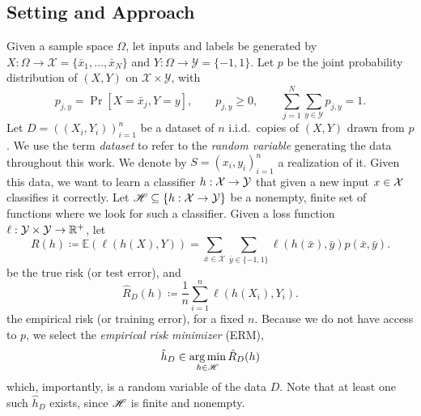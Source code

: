 \documentclass[reqno]{amsart}
\begin{document}
\subsection{Setting and Approach}
Given a sample space $\Omega$, let inputs and labels be generated by $X:\Omega \to \mathcal X = \{\bar x_1,\ldots,\bar x_N\}$ and $Y: \Omega \to \mathcal Y = \{-1, 1\}$. Let $p$ be the joint probability distribution of $(X,Y)$ on $\mathcal X\times\mathcal Y$, with
\[
 p_{j,y}=\Pr[X=\bar x_j,Y=y],\qquad
 p_{j,y}\ge0,\qquad
 \sum_{j=1}^N\sum_{y\in\mathcal Y}p_{j,y}=1.
\]
Let $D = {((X_i, Y_i))}_{i=1}^n$ be a dataset of $n$ i.i.d.\ copies of $(X,Y)$ drawn from $p$. We use the term {\it dataset\/} to refer to the {\it random variable\/} generating the data throughout this work. We denote by $S = {(x_i, y_i)}_{i=1}^n$ a realization of it. Given this data, we want to learn a classifier $h:\mathcal{X}\to\mathcal{Y}$ that given a new input $x\in\mathcal{X}$ classifies it correctly. 
Let $\mathscr{H} \subseteq \{h:\mathcal X \to \mathcal{Y}\}$ be a nonempty, finite set of functions where we look for such a classifier.
Given a loss function $\ell:\mathcal{Y} \times \mathcal Y \to \mathbb R^+$, let
\[
    R(h) \coloneq \mathbb E(\ell(h(X), Y)) = \sum_{\bar x\in\mathcal X} \sum_{\bar y \in\{-1,1\}} \ell(h(\bar x), \bar y) p(\bar x, \bar y).
\]
be the true risk (or test error), and
\[
    \hat R_D (h) \coloneq \frac{1}{n}\sum_{i=1}^n \ell(h(X_i), Y_i).
\]
the empirical risk (or training error), for a fixed $n$. 
Because we do not have access to $p$, we select the {\it empirical risk minimizer\/} (ERM), 
\begin{equation}\label{eq: ERM}
    \hat h_D \in \operatorname*{arg\,min}_{h\in \mathscr{H}} \hat R_D (h)
\end{equation}
which, importantly, is a random variable of the data $D$. Note that at least one such $\hat h_D$ exists, since $\mathscr{H}$ is finite and nonempty. 
\end{document}
